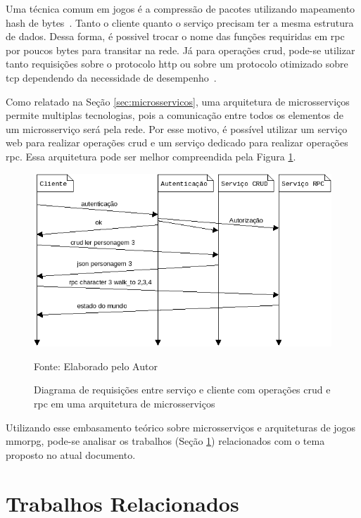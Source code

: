 Uma técnica comum em jogos é a compressão de pacotes utilizando mapeamento hash de bytes~\cite{LeckyThompson2008Nov}.
%
Tanto o cliente quanto o serviço precisam ter a mesma estrutura de dados.
%
Dessa forma, é possivel trocar o nome das funções requiridas em \ac{rpc} por poucos bytes para transitar na rede.
%
Já para operações \ac{crud}, pode-se utilizar tanto requisições sobre o protocolo \ac{http} ou sobre um protocolo otimizado sobre \ac{tcp} dependendo da necessidade de desempenho~\cite{LeckyThompson2008Nov}.

Como relatado na Seção \ref{sec:microsservicos}, uma arquitetura de microsserviços permite multiplas tecnologias, pois a comunicação entre todos os elementos de um microsserviço será pela rede.
%
Por esse motivo, é possível utilizar um serviço web para realizar operações \ac{crud} e um serviço dedicado para realizar operações \ac{rpc}.
%
Essa arquitetura pode ser melhor compreendida pela Figura \ref{fig:network_crud_rpc_micro}.



\begin{figure}[htb!]
\caption{Diagrama de requisições entre serviço e cliente com operações \ac{crud} e \ac{rpc} em uma arquitetura de microsserviços}
\label{fig:network_crud_rpc_micro}
\includegraphics[height=6.5cm]{img/cap2/network_rpc_crud_micro.png}
\centering

Fonte: Elaborado pelo Autor
\end{figure}



Utilizando esse embasamento teórico sobre microsserviços e arquiteturas de jogos \ac{mmorpg}, pode-se analisar os trabalhos (Seção \ref{sec:similares}) relacionados com o tema proposto no atual documento.



\section{Trabalhos Relacionados}
\label{sec:similares}



